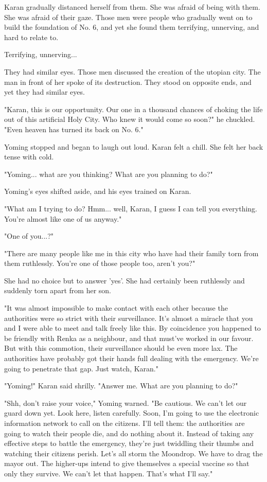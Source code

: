 Karan gradually distanced herself from them. She was afraid of being
with them. She was afraid of their gaze. Those men were people who
gradually went on to build the foundation of No. 6, and yet she found
them terrifying, unnerving, and hard to relate to.

Terrifying, unnerving...

They had similar eyes. Those men discussed the creation of the utopian
city. The man in front of her spoke of its destruction. They stood on
opposite ends, and yet they had similar eyes.

"Karan, this is our opportunity. Our one in a thousand chances of
choking the life out of this artificial Holy City. Who knew it would
come so soon?" he chuckled. "Even heaven has turned its back on No. 6."

Yoming stopped and began to laugh out loud. Karan felt a chill. She felt
her back tense with cold.

"Yoming... what are you thinking? What are you planning to do?"

Yoming's eyes shifted aside, and his eyes trained on Karan.

"What am I trying to do? Hmm... well, Karan, I guess I can tell you
everything. You're almost like one of us anyway."

"One of you...?"

"There are many people like me in this city who have had their family
torn from them ruthlessly. You're one of those people too, aren't you?"

She had no choice but to answer 'yes'. She had certainly been ruthlessly
and suddenly torn apart from her son.

"It was almost impossible to make contact with each other because the
authorities were so strict with their surveillance. It's almost a
miracle that you and I were able to meet and talk freely like this. By
coincidence you happened to be friendly with Renka as a neighbour, and
that must've worked in our favour. But with this commotion, their
surveillance should be even more lax. The authorities have probably got
their hands full dealing with the emergency. We're going to penetrate
that gap. Just watch, Karan."

"Yoming!" Karan said shrilly. "Answer me. What are you planning to do?"

"Shh, don't raise your voice," Yoming warned. "Be cautious. We can't let
our guard down yet. Look here, listen carefully. Soon, I'm going to use
the electronic information network to call on the citizens. I'll tell
them: the authorities are going to watch their people die, and do
nothing about it. Instead of taking any effective steps to battle the
emergency, they're just twiddling their thumbs and watching their
citizens perish. Let's all storm the Moondrop. We have to drag the mayor
out. The higher-ups intend to give themselves a special vaccine so that
only they survive. We can't let that happen. That's what I'll say."

